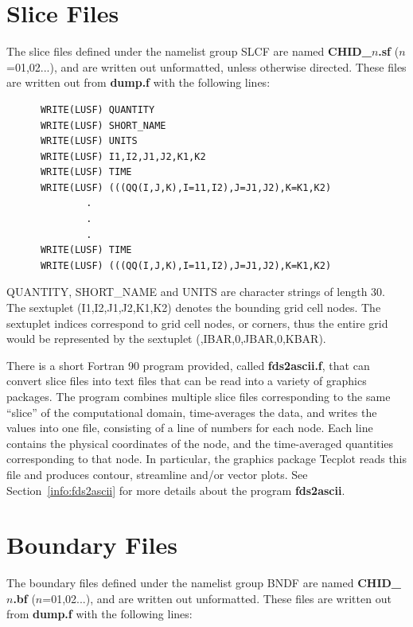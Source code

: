 \documentclass[11pt]{book}
\begin{document}
\section{Slice Files}
\label{out:SLCF}
The slice files defined under the namelist group {\ct SLCF} are
named {\bf CHID\_$n$.sf} ($n$=01,02...),
and are written out unformatted, unless otherwise directed.
These files are written out from {\bf dump.f} with the following lines:

\footnotesize
\begin{verbatim}
      WRITE(LUSF) QUANTITY
      WRITE(LUSF) SHORT_NAME
      WRITE(LUSF) UNITS
      WRITE(LUSF) I1,I2,J1,J2,K1,K2
      WRITE(LUSF) TIME
      WRITE(LUSF) (((QQ(I,J,K),I=11,I2),J=J1,J2),K=K1,K2)
              .
              .
              .
      WRITE(LUSF) TIME
      WRITE(LUSF) (((QQ(I,J,K),I=11,I2),J=J1,J2),K=K1,K2)
\end{verbatim}
\normalsize
{\ct QUANTITY}, {\ct SHORT\_NAME} and {\ct UNITS} are
character strings of length 30.
The sextuplet ({\ct I1,I2,J1,J2,K1,K2}) denotes the bounding grid cell
nodes. The sextuplet indices correspond to grid cell
nodes, or corners, thus the entire grid would be represented by the
sextuplet ({,IBAR,0,JBAR,0,KBAR}).

There is a short Fortran 90 program provided, called
{\bf fds2ascii.f},
that can convert slice files into text files that can be read
into a variety of graphics packages. The program combines multiple
slice files corresponding to the same ``slice'' of the computational
domain, time-averages the data, and writes the values into one file,
consisting of a line of numbers for each node. Each line contains the
physical coordinates of the node, and the time-averaged quantities
corresponding to that node. In particular, the graphics package
Tecplot
reads this file and produces contour, streamline and/or vector plots.
See Section~\ref{info:fds2ascii} for more details about the program
{\bf fds2ascii}.

\section{Boundary Files}%
\label{out:BNDF}
The boundary files defined under the namelist group {\ct BNDF} are
named {\bf CHID\_$n$.bf} ($n$=01,02...),
and are written out unformatted.
These files are written out from {\bf dump.f} with the following lines:
\end{document}
